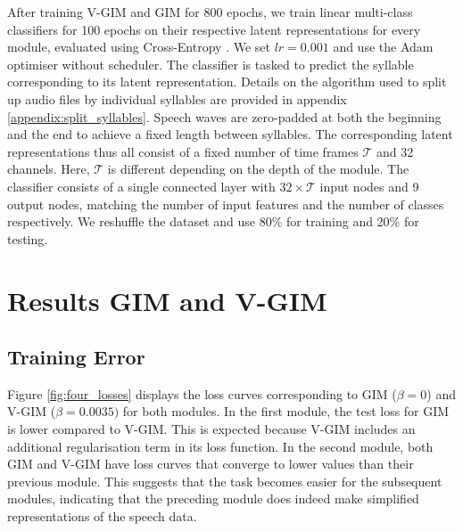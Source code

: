 	
		After training V-GIM and GIM for 800 epochs, we train linear multi-class classifiers for 100 epochs on their respective latent representations for every module, evaluated using Cross-Entropy \citep{hoRealWorldWeightCrossEntropyLoss2020}. We set $lr=0.001$ and use the Adam optimiser without scheduler. The classifier is tasked to predict the syllable corresponding to its latent representation. Details on the algorithm used to split up audio files by individual syllables are provided in appendix \ref{appendix:split_syllables}. Speech waves are zero-padded at both the beginning and the end to achieve a fixed length between syllables. The corresponding latent representations thus all consist of a fixed number of time frames $\mathcal{T}$ and 32 channels. Here, $\mathcal{T}$ is different depending on the depth of the module. 
		The classifier consists of a single connected layer with $32 \times \mathcal{T}$ input nodes and 9 output nodes, matching the number of input features and the number of classes respectively.  We reshuffle the dataset and use 80\% for training and 20\% for testing.

	

	\section{Results GIM and V-GIM}	
	\subsection{Training Error} \label{cha:experiments_vgim_train_err}
		
		
		Figure \ref{fig:four_losses} displays the loss curves corresponding to GIM ($\beta=0$) and V-GIM ($\beta=0.0035)$ for both modules. In the first module, the test loss for GIM is lower compared to V-GIM. This is expected because V-GIM includes an additional regularisation term in its loss function. In the second module, both GIM and V-GIM have loss curves that converge to lower values than their previous module. This suggests that the task becomes easier for the subsequent modules, indicating that the preceding module does indeed make simplified representations of the speech data.
		
